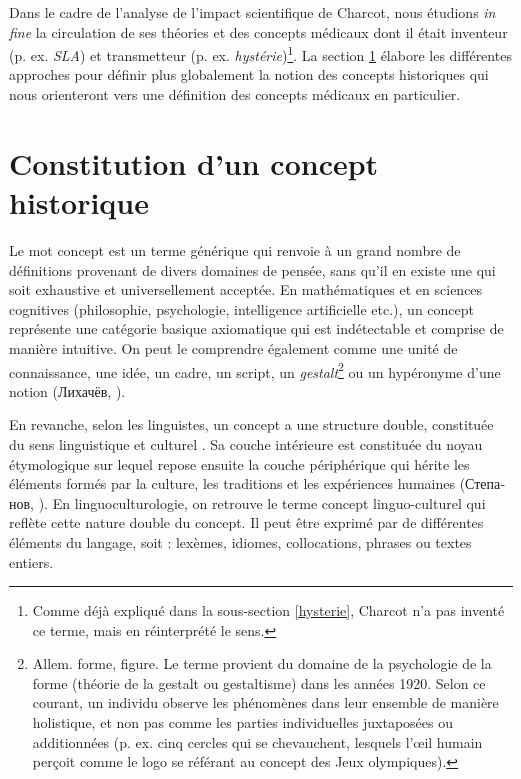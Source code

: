 Dans le cadre de l'analyse de l'impact scientifique de Charcot, nous étudions \textit{in fine} la circulation de ses théories et des concepts médicaux dont il était inventeur (p. ex. \textit{SLA}) et transmetteur (p. ex. \textit{hystérie})\footnote{Comme déjà expliqué dans la sous-section \ref{hysterie}, Charcot n'a pas inventé ce terme, mais en réinterprété le sens.}. La section \ref{concept} élabore les différentes approches pour définir plus globalement la notion des concepts historiques qui nous orienteront vers une définition des concepts médicaux en particulier. 

\section{Constitution d'un concept historique}
\label{concept}

Le mot \og{}concept\fg{} est un terme générique qui renvoie à un grand nombre de définitions provenant de divers domaines de pensée, sans qu'il en existe une qui soit exhaustive et universellement acceptée. En mathématiques et en sciences cognitives (philosophie, psychologie, intelligence artificielle etc.), un concept représente une catégorie basique axiomatique qui est indétectable et comprise de manière intuitive. On peut le comprendre également comme une unité de connaissance, une idée, un cadre, un script, un \textit{gestalt}\footnote{Allem. \og{}forme, figure\fg{}. Le terme provient du domaine de la psychologie de la forme (théorie de la gestalt ou gestaltisme) dans les années 1920. Selon ce courant, un individu observe les phénomènes dans leur ensemble de manière holistique, et non pas comme les parties individuelles juxtaposées ou additionnées (p. ex. cinq cercles qui se chevauchent, lesquels l'{\oe}il humain perçoit comme le logo se référant au concept des Jeux olympiques).} ou un hypéronyme d'une notion \foreignlanguage{russian}{(Лихачёв, \citeyear{lihachev1997}}). 

En revanche, selon les linguistes, un concept a une structure double, constituée du sens linguistique et culturel
 \citep{nemickiene2011concept}. Sa couche intérieure est constituée du noyau étymologique sur lequel repose ensuite la couche périphérique qui hérite les éléments formés par la culture, les traditions et les expériences humaines \foreignlanguage{russian}{(Степанов, \citeyear{stepanov2007}}). En linguoculturologie, on retrouve le terme \og{}concept linguo-culturel\fg{} qui reflète cette nature double du concept. Il peut être exprimé par de différentes éléments du langage, soit : lexèmes, idiomes, collocations, phrases ou textes entiers. 
 
